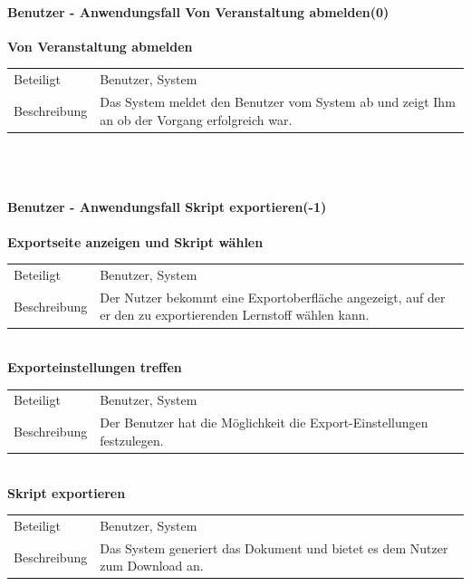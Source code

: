 \documentclass[12pt,a4paper]{article}
\begin{document}
\paragraph{Benutzer - Anwendungsfall \glqq Von Veranstaltung abmelden\grqq (0)}\mbox{}

\textbf{Von Veranstaltung abmelden}\\
\begin{tabular}{l|p{12cm}}
	\hline 
	Beteiligt & Benutzer, System \\ 
	Beschreibung & Das System meldet den Benutzer vom System ab und zeigt Ihm an ob der Vorgang erfolgreich war. \\ 
\end{tabular}\\\\


\paragraph{Benutzer - Anwendungsfall \glqq Skript exportieren\grqq (-1)}\mbox{}

\textbf{Exportseite anzeigen und Skript wählen}\\
\begin{tabular}{l|p{12cm}}
	\hline 
	Beteiligt & Benutzer, System \\ 
	Beschreibung & Der Nutzer bekommt eine Exportoberfläche angezeigt, auf der er den zu exportierenden Lernstoff wählen kann. \\ 
\end{tabular}\\

\textbf{Exporteinstellungen treffen}\\
\begin{tabular}{l|p{12cm}}
	\hline 
	Beteiligt & Benutzer, System \\ 
	Beschreibung & Der Benutzer hat die Möglichkeit die Export-Einstellungen festzulegen. \\ 
\end{tabular}\\

\textbf{Skript exportieren}\\
\begin{tabular}{l|p{12cm}}
	\hline 
	Beteiligt & Benutzer, System \\ 
	Beschreibung & Das System generiert das Dokument und bietet es dem Nutzer zum Download an. \\ 
\end{tabular}\\\\
\end{document}
